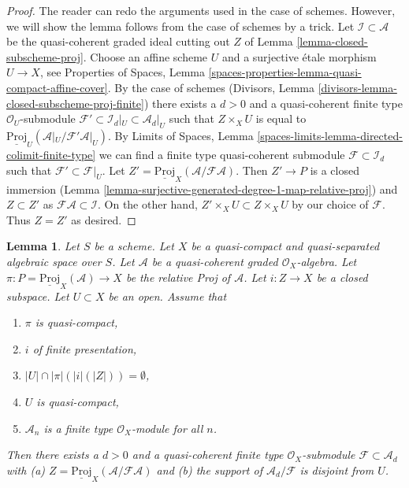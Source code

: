 \documentclass{stacks-project}
\theoremstyle{plain}
\newtheorem{lemma}[subsection]{Lemma}
\theoremstyle{definition}
\theoremstyle{remark}
\numberwithin{equation}{subsection}
\begin{document}
\begin{proof}
The reader can redo the arguments used in the case of schemes. However, we
will show the lemma follows from the case of schemes by a trick.
Let $\mathcal{I} \subset \mathcal{A}$ be the quasi-coherent graded
ideal cutting out $Z$ of Lemma \ref{lemma-closed-subscheme-proj}.
Choose an affine scheme $U$ and a surjective \'etale morphism
$U \to X$, see Properties of Spaces, Lemma
\ref{spaces-properties-lemma-quasi-compact-affine-cover}.
By the case of schemes
(Divisors, Lemma \ref{divisors-lemma-closed-subscheme-proj-finite})
there exists a $d > 0$ and a quasi-coherent finite type
$\mathcal{O}_U$-submodule
$\mathcal{F}' \subset \mathcal{I}_d|_U \subset \mathcal{A}_d|_U$
such that $Z \times_X U$ is equal to
$\underline{\text{Proj}}_U(\mathcal{A}|_U/\mathcal{F}'\mathcal{A}|_U)$.
By Limits of Spaces, Lemma
\ref{spaces-limits-lemma-directed-colimit-finite-type}
we can find a finite type quasi-coherent submodule
$\mathcal{F} \subset \mathcal{I}_d$ such that
$\mathcal{F}' \subset \mathcal{F}|_U$. Let
$Z' = \underline{\text{Proj}}_X(\mathcal{A}/\mathcal{F}\mathcal{A})$.
Then $Z' \to P$ is a closed immersion
(Lemma \ref{lemma-surjective-generated-degree-1-map-relative-proj})
and $Z \subset Z'$ as $\mathcal{F}\mathcal{A} \subset \mathcal{I}$.
On the other hand, $Z' \times_X U \subset Z \times_X U$ by our
choice of $\mathcal{F}$. Thus $Z = Z'$ as desired.
\end{proof}

\begin{lemma}
\label{lemma-closed-subscheme-proj-finite-type}
Let $S$ be a scheme. Let $X$ be a quasi-compact and quasi-separated
algebraic space over $S$.
Let $\mathcal{A}$ be a quasi-coherent graded $\mathcal{O}_X$-algebra.
Let $\pi : P = \underline{\text{Proj}}_X(\mathcal{A}) \to X$ be the relative
Proj of $\mathcal{A}$. Let $i : Z \to X$ be a closed subspace.
Let $U \subset X$ be an open. Assume that
\begin{enumerate}
\item $\pi$ is quasi-compact,
\item $i$ of finite presentation,
\item $|U| \cap |\pi|(|i|(|Z|)) = \emptyset$,
\item $U$ is quasi-compact,
\item $\mathcal{A}_n$ is a finite type $\mathcal{O}_X$-module for all $n$.
\end{enumerate}
Then there exists a $d > 0$ and a quasi-coherent finite type
$\mathcal{O}_X$-submodule $\mathcal{F} \subset \mathcal{A}_d$ with (a)
$Z = \underline{\text{Proj}}_X(\mathcal{A}/\mathcal{F}\mathcal{A})$
and (b) the support of $\mathcal{A}_d/\mathcal{F}$ is disjoint from $U$.
\end{lemma}
\end{document}
